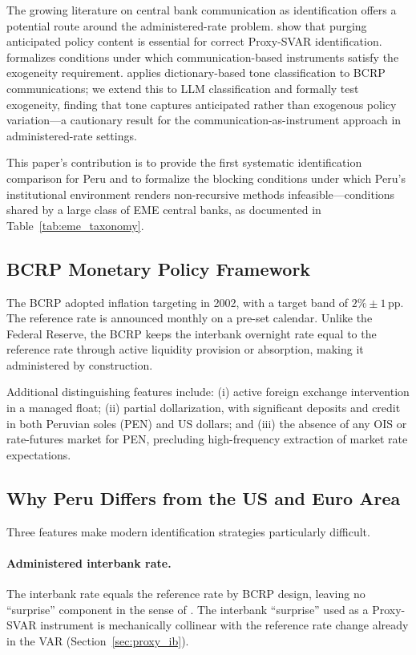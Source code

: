 \documentclass[12pt,letterpaper]{article}
\begin{document}
The growing literature on central bank communication as identification
offers a potential route around the administered-rate problem.
\citet{mirandaagrippino2021} show that purging anticipated policy content
is essential for correct Proxy-SVAR identification. \citet{wolf2020}
formalizes conditions under which communication-based instruments satisfy
the exogeneity requirement. \citet{lahura2020} applies dictionary-based
tone classification to BCRP communications; we extend this to LLM
classification and formally test exogeneity, finding that tone captures
anticipated rather than exogenous policy variation---a cautionary result
for the communication-as-instrument approach in administered-rate settings.

This paper's contribution is to provide the first systematic identification
comparison for Peru and to formalize the blocking conditions under which
Peru's institutional environment renders non-recursive methods infeasible---conditions
shared by a large class of EME central banks, as documented in
Table~\ref{tab:eme_taxonomy}.

\subsection{BCRP Monetary Policy Framework}

The BCRP adopted inflation targeting in 2002, with a target band of
$2\%\pm1$\,pp. The reference rate is announced monthly on a pre-set
calendar. Unlike the Federal Reserve, the BCRP keeps the interbank
overnight rate equal to the reference rate through active liquidity
provision or absorption, making it administered by construction.

Additional distinguishing features include: (i) active foreign exchange
intervention in a managed float; (ii) partial dollarization, with significant
deposits and credit in both Peruvian soles (PEN) and US dollars; and (iii) the
absence of any OIS or rate-futures market for PEN, precluding high-frequency
extraction of market rate expectations.

\subsection{Why Peru Differs from the US and Euro Area}

Three features make modern identification strategies particularly difficult.

\paragraph{Administered interbank rate.} The interbank rate equals the
reference rate by BCRP design, leaving no ``surprise'' component in the sense
of \citet{gertler2015}. The interbank ``surprise'' used as a Proxy-SVAR
instrument is mechanically collinear with the reference rate change already
in the VAR (Section~\ref{sec:proxy_ib}).
\end{document}
